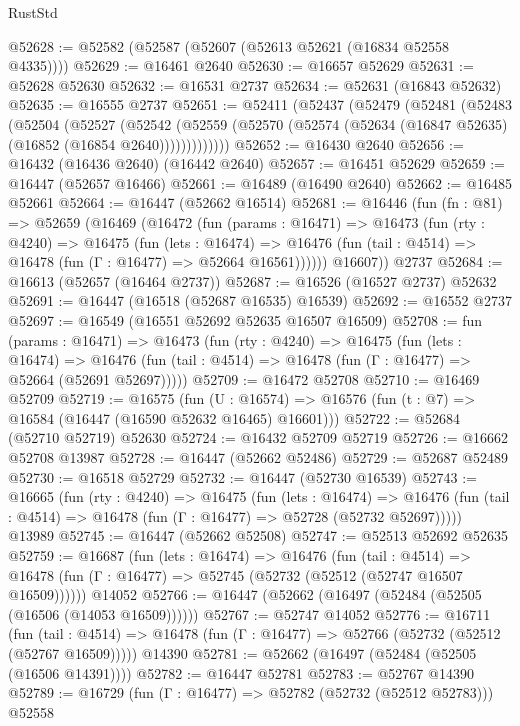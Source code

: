 \begin{lexlean}{RustStd}
\begin{coremodule}
{\begin{coremodule}
{{{{{{{{{{{{{{{{{{{{{{{{{{{{{{{{{{{{{{{{{{{{{{{{{{{{{{{@52628 := @52582 (@52587 (@52607 (@52613 @52621 (@16834 @52558 @4335))))
@52629 := @16461 @2640
@52630 := @16657 @52629
@52631 := @52628 @52630
@52632 := @16531 @2737
@52634 := @52631 (@16843 @52632)
@52635 := @16555 @2737
@52651 := @52411
    (@52437
      (@52479
        (@52481
          (@52483
            (@52504
              (@52527
                (@52542
                  (@52559 (@52570 (@52574 (@52634 (@16847 @52635) (@16852 (@16854 @2640)))))))))))))
@52652 := @16430 @2640
@52656 := @16432 (@16436 @2640) (@16442 @2640)
@52657 := @16451 @52629
@52659 := @16447 (@52657 @16466)
@52661 := @16489 (@16490 @2640)
@52662 := @16485 @52661
@52664 := @16447 (@52662 @16514)
@52681 := @16446
    (fun (fn : @81) =>
    @52659
      (@16469
        (@16472
          (fun (params : @16471) =>
          @16473
            (fun (rty : @4240) =>
            @16475
              (fun (lets : @16474) =>
              @16476 (fun (tail : @4514) => @16478 (fun (Γ : @16477) => @52664 @16561))))))
        @16607))
    @2737
@52684 := @16613 (@52657 (@16464 @2737))
@52687 := @16526 (@16527 @2737) @52632
@52691 := @16447 (@16518 (@52687 @16535) @16539)
@52692 := @16552 @2737
@52697 := @16549 (@16551 @52692 @52635 @16507 @16509)
@52708 := fun (params : @16471) =>
  @16473
    (fun (rty : @4240) =>
    @16475
      (fun (lets : @16474) =>
      @16476 (fun (tail : @4514) => @16478 (fun (Γ : @16477) => @52664 (@52691 @52697)))))
@52709 := @16472 @52708
@52710 := @16469 @52709
@52719 := @16575
    (fun (U : @16574) => @16576 (fun (t : @7) => @16584 (@16447 (@16590 @52632 @16465) @16601)))
@52722 := @52684 (@52710 @52719) @52630
@52724 := @16432 @52709 @52719
@52726 := @16662 @52708 @13987
@52728 := @16447 (@52662 @52486)
@52729 := @52687 @52489
@52730 := @16518 @52729
@52732 := @16447 (@52730 @16539)
@52743 := @16665
    (fun (rty : @4240) =>
    @16475
      (fun (lets : @16474) =>
      @16476 (fun (tail : @4514) => @16478 (fun (Γ : @16477) => @52728 (@52732 @52697)))))
    @13989
@52745 := @16447 (@52662 @52508)
@52747 := @52513 @52692 @52635
@52759 := @16687
    (fun (lets : @16474) =>
    @16476
      (fun (tail : @4514) =>
      @16478 (fun (Γ : @16477) => @52745 (@52732 (@52512 (@52747 @16507 @16509))))))
    @14052
@52766 := @16447 (@52662 (@16497 (@52484 (@52505 (@16506 (@14053 @16509))))))
@52767 := @52747 @14052
@52776 := @16711
    (fun (tail : @4514) => @16478 (fun (Γ : @16477) => @52766 (@52732 (@52512 (@52767 @16509)))))
    @14390
@52781 := @52662 (@16497 (@52484 (@52505 (@16506 @14391))))
@52782 := @16447 @52781
@52783 := @52767 @14390
@52789 := @16729 (fun (Γ : @16477) => @52782 (@52732 (@52512 @52783))) @52558
}}}}}}}}}}}}}}}}}}}}}}}}}}}}}}}}}}}}}}}}}}}}}}}}}}}}}}}
\end{coremodule}}
\end{coremodule}
\end{lexlean}

